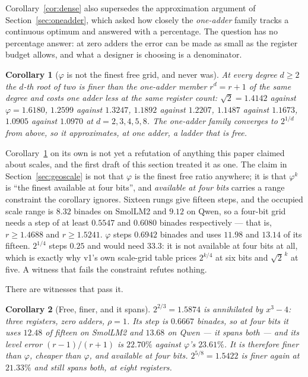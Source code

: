 \documentclass[11pt]{article}
\newtheorem{corollary}{Corollary}
\theoremstyle{definition}
\begin{document}
Corollary~\ref{cor:dense} also supersedes the approximation argument of
Section~\ref{sec:oneadder}, which asked how closely the \emph{one-adder} family
tracks a continuous optimum and answered with a percentage. The question has no
percentage answer: at zero adders the error can be made as small as the register
budget allows, and what a designer is choosing is a denominator.

\begin{corollary}[$\varphi$ is not the finest free grid, and never was]
\label{cor:notfinest}
At every degree $d\ge2$ the $d$-th root of two is finer than the one-adder
member $r^{d}=r+1$ of the same degree and costs one adder less at the same
register count: $\sqrt2=1.4142$ against $\varphi=1.6180$, $1.2599$ against
$1.3247$, $1.1892$ against $1.2207$, $1.1487$ against $1.1673$, $1.0905$
against $1.0970$ at $d=2,3,4,5,8$. The one-adder family converges to $2^{1/d}$
from above, so it approximates, at one adder, a ladder that is free.
\end{corollary}

Corollary~\ref{cor:notfinest} on its own is not yet a refutation of anything
this paper claimed about scales, and the first draft of this section treated it
as one. The claim in Section~\ref{sec:geoscale} is not that $\varphi$ is the
finest free ratio anywhere; it is that $\varphi^{k}$ is ``the finest available
at four bits'', and \emph{available at four bits} carries a range constraint the
corollary ignores. Sixteen rungs give fifteen steps, and the occupied scale
range is $8.32$ binades on SmolLM2 and $9.12$ on Qwen, so a four-bit grid needs
a step of at least $0.5547$ and $0.6080$ binades respectively --- that is,
$r\ge1.4688$ and $r\ge1.5241$. $\varphi$ steps $0.6942$ binades and uses $11.98$
and $13.14$ of its fifteen. $2^{1/4}$ steps $0.25$ and would need $33.3$: it is
not available at four bits at all, which is exactly why v1's own scale-grid
table prices $2^{k/4}$ at six bits and $\sqrt2^{\,k}$ at five. A witness that
fails the constraint refutes nothing.

There are witnesses that pass it.

\begin{corollary}[Free, finer, and it spans]\label{cor:freefiner}
$2^{2/3}=1.5874$ is annihilated by $x^{3}-4$: three registers, zero adders,
$\rho=1$. Its step is $0.6667$ binades, so at four bits it uses $12.48$ of
fifteen on SmolLM2 and $13.68$ on Qwen --- it spans both --- and its level error
$(r-1)/(r+1)$ is $22.70\%$ against $\varphi$'s $23.61\%$. It is therefore finer
than $\varphi$, cheaper than $\varphi$, and available at four bits.
$2^{5/8}=1.5422$ is finer again at $21.33\%$ and still spans both, at eight
registers.
\end{corollary}
\end{document}
